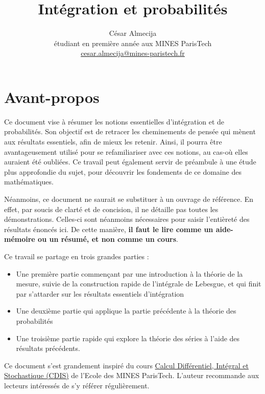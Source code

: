 \documentclass[french]{report}
\theoremstyle{plain}
\theoremstyle{definition}
\theoremstyle{remark}
\newcommand\itemb{\item[$\bullet$]}
\begin{document}
\title{Intégration et probabilités}
\author{César Almecija
\\ étudiant en première année aux MINES ParisTech
\\ \href{mailto:cesar.almecija@mines-paristech.fr}{cesar.almecija@mines-paristech.fr}}

\maketitle

\chapter*{Avant-propos}
Ce document vise à résumer les notions essentielles d'intégration et de probabilités.
Son objectif est de retracer les cheminements de pensée qui mènent aux résultats essentiels, afin de mieux les retenir.
Ainsi, il pourra être avantageusement utilisé pour se refamiliariser avec ces notions, au cas-où elles auraient été oubliées.
Ce travail peut également servir de préambule à une étude plus approfondie du sujet, pour découvrir les fondements de ce domaine des mathématiques.

Néanmoins, ce document ne saurait se substituer à un ouvrage de référence. En effet, par soucis de clarté et de concision, il ne détaille pas toutes les démonstrations.
Celles-ci sont néanmoins nécessaires pour saisir l'entièreté des résultats énoncés ici. De cette manière, \textbf{il faut le lire comme un aide-mémoire ou un résumé, et non comme un cours}.

\bigskip

Ce travail se partage en trois grandes parties :
\begin{itemize}
  \itemb Une première partie commençant par une introduction à la théorie de la mesure, suivie de la construction rapide de l'intégrale de Lebesgue, et qui finit par s'attarder sur les résultats essentiels d'intégration
  \itemb Une deuxième partie qui applique la partie précédente à la théorie des probabilités
  \itemb Une troisième partie rapide qui explore la théorie des séries à l'aide des résultats précédents.
\end{itemize}

\bigskip

Ce document s'est grandement inspiré du cours \href{https://github.com/boisgera/CDIS}{Calcul Différentiel, Intégral et Stochastique (CDIS)} de l'Ecole des MINES ParisTech.
L'auteur recommande aux lecteurs intéressés de s'y référer régulièrement.
\end{document}
